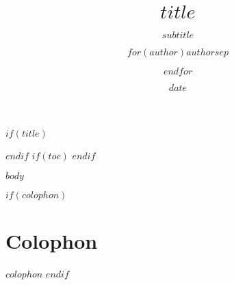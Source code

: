\documentclass[11pt,oneside]{scrbook}
\title{\sffamily\bfseries\Huge $title$}
\subtitle{\sffamily\Large\color{black!60} $subtitle$}
\author{\sffamily\large $for(author)$$author$$sep$ \and $endfor$}
\date{\sffamily $date$}
\date{}
\begin{document}
\frontmatter
$if(title)$
  \maketitle
$endif$
$if(toc)$
  \tableofcontents
  \cleardoublepage
$endif$

\mainmatter
$body$

\backmatter
$if(colophon)$
  \chapter*{Colophon}
  $colophon$
$endif$
\end{document}
